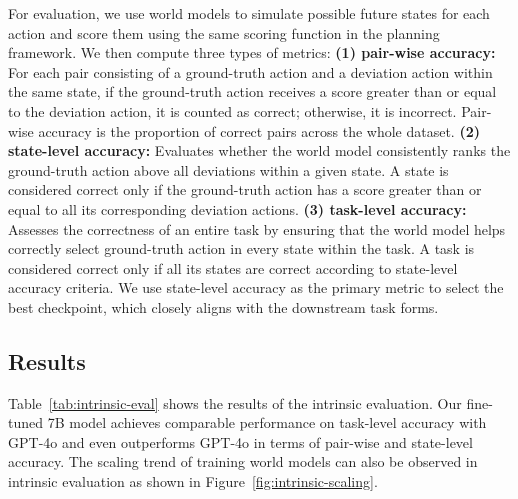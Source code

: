 For evaluation, we use world models to simulate possible future states for each action and score them using the same scoring function in the planning framework.
We then compute three types of metrics: \textbf{(1) pair-wise accuracy:} For each pair consisting of a ground-truth action and a deviation action within the same state, if the ground-truth action receives a score greater than or equal to the deviation action, it is counted as correct; otherwise, it is incorrect. Pair-wise accuracy is the proportion of correct pairs across the whole dataset. \textbf{(2) state-level accuracy:} Evaluates whether the world model consistently ranks the ground-truth action above all deviations within a given state. A state is considered correct only if the ground-truth action has a score greater than or equal to all its corresponding deviation actions. \textbf{(3) task-level accuracy:} Assesses the correctness of an entire task by ensuring that the world model helps correctly select ground-truth action in every state within the task. A task is considered correct only if all its states are correct according to state-level accuracy criteria.
We use state-level accuracy as the primary metric to select the best checkpoint, which closely aligns with the downstream task forms.

\subsection{Results}


Table~\ref{tab:intrinsic-eval} shows the results of the intrinsic evaluation. Our fine-tuned 7B model achieves comparable performance on task-level accuracy with GPT-4o and even outperforms GPT-4o in terms of pair-wise and state-level accuracy. The scaling trend of training world models can also be observed in intrinsic evaluation as shown in Figure~\ref{fig:intrinsic-scaling}.


